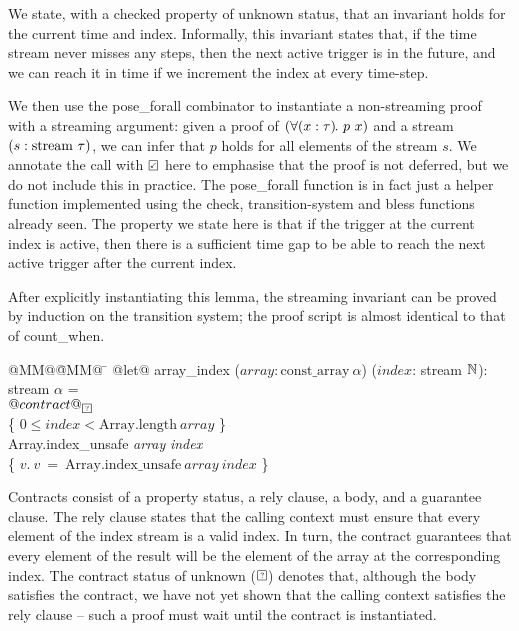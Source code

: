 We state, with a checked property of unknown status, that an invariant holds for the current time and index.
Informally, this invariant states that, if the time stream never misses any steps, then the next active trigger is in the future, and we can reach it in time if we increment the index at every time-step.

We then use the pose_forall combinator to instantiate a non-streaming proof with a streaming argument: given a proof of $(\forall (x: \tau)\hspace{-0.1em}.~p~x)$ and a stream $(s: \text{stream}~{\tau})$, we can infer that $p$ holds for all elements of the stream $s$.
We annotate the call with $\PSValid$ here to emphasise that the proof is not deferred, but we do not include this in practice.
The pose_forall function is in fact just a helper function implemented using the check, transition-system and bless functions already seen.
The property we state here is that if the trigger at the current index is active, then there is a sufficient time gap to be able to reach the next active trigger after the current index.

After explicitly instantiating this lemma, the streaming invariant can be proved by induction on the transition system; the proof script is almost identical to that of count_when.

\begin{tabbing}
  @MM@\= @MM@ \= \kill
  @let@ array_index ($\textit{array}: \mbox{const_array}~\alpha$) ($\textit{index}$: stream $\mathbb{N}$): stream $\alpha$ = \\
  \> $@contract@_{\PSUnknown}$ \\
  \> \> \{ $0 \le \textit{index} < \mbox{Array.length}~\textit{array}$ \} \\
  \> \> Array.index_unsafe \textit{array} \textit{index} \\
  \> \> \{ $v.~v~=~\mbox{Array.index_unsafe}~\textit{array}~\textit{index}$ \} \\
\end{tabbing}

Contracts consist of a property status, a rely clause, a body, and a guarantee clause.
The rely clause states that the calling context must ensure that every element of the index stream is a valid index.
In turn, the contract guarantees that every element of the result will be the element of the array at the corresponding index.
The contract status of unknown ($\PSUnknown$) denotes that, although the body satisfies the contract, we have not yet shown that the calling context satisfies the rely clause -- such a proof must wait until the contract is instantiated.


